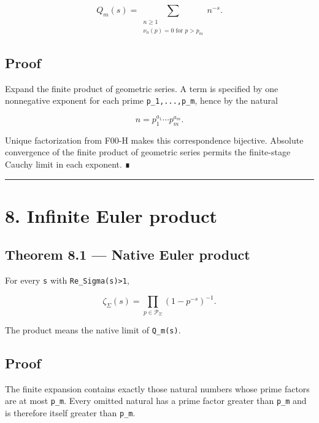 \[
\boxed{
Q_m(s)
=
\sum_{\substack{n\ge1\\
\nu_n(p)=0\text{ for }p>p_m}}
n^{-s}.
}
\]

\hypertarget{proof-10}{%
\subsection{Proof}\label{proof-10}}

Expand the finite product of geometric series. A term is specified by one
nonnegative exponent for each prime \texttt{p\_1,...,p\_m}, hence by the natural

\[
n=p_1^{a_1}\cdots p_m^{a_m}.
\]

Unique factorization from F00-H makes this correspondence bijective. Absolute
convergence of the finite product of geometric series permits the finite-stage
Cauchy limit in each exponent. ∎

\begin{center}\rule{0.5\linewidth}{0.5pt}\end{center}

\hypertarget{infinite-euler-product}{%
\section{8. Infinite Euler product}\label{infinite-euler-product}}

\hypertarget{theorem-8.1-native-euler-product}{%
\subsection{Theorem 8.1 --- Native Euler product}\label{theorem-8.1-native-euler-product}}

For every \texttt{s} with \texttt{Re\_Sigma(s)\textgreater{}1},

\[
\boxed{
\zeta_\Sigma(s)
=
\prod_{p\in\mathcal P_\Sigma}
(1-p^{-s})^{-1}.
}
\]

The product means the native limit of \texttt{Q\_m(s)}.

\hypertarget{proof-11}{%
\subsection{Proof}\label{proof-11}}

The finite expansion contains exactly those natural numbers whose prime factors
are at most \texttt{p\_m}. Every omitted natural has a prime factor greater than \texttt{p\_m}
and is therefore itself greater than \texttt{p\_m}.

